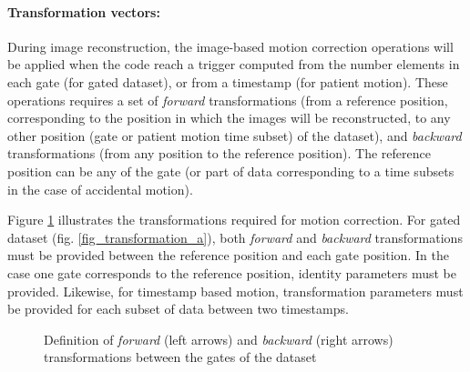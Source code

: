 \documentclass[a4paper, 11pt]{article}
\begin{document}
\paragraph{Transformation vectors:} During image reconstruction, the image-based motion correction operations will be applied when the code reach a trigger computed from the number elements in each gate (for gated dataset), or from a timestamp (for patient motion). These operations requires a set of \textit{forward} transformations (from a reference position, corresponding to the position in which the images will be reconstructed, to any other position (gate or patient motion time subset) of the dataset), and \textit{backward} transformations (from any position to the reference position). The reference position can be any of the gate (or part of data corresponding to a time subsets in the case of accidental motion). 

Figure \ref{fig_transformation} illustrates the transformations required for motion correction. For gated dataset (fig. \ref{fig_transformation_a}), both \textit{forward} and \textit{backward} transformations must be provided between the reference position and each gate position. In the case one gate corresponds to the reference position, identity parameters must be provided. Likewise, for timestamp based motion, transformation parameters must be provided for each subset of data between two timestamps.


\begin{figure} [h]
  \centerline
  {
  }
  \caption{Definition of \textit{forward} (left arrows) and \textit{backward} (right arrows) transformations between the gates of the dataset}
  \label{fig_transformation}
\end{figure}
\end{document}
